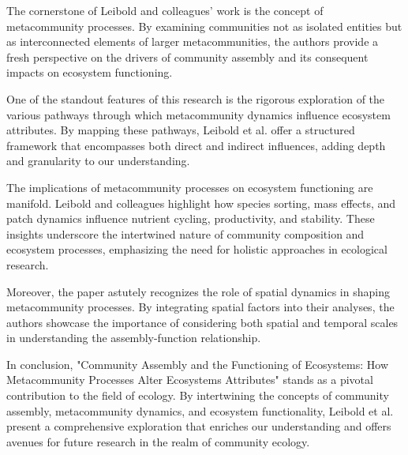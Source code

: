 \documentclass[sn-nature]{sn-jnl}%
\theoremstyle{thmstyleone}%
\theoremstyle{thmstyletwo}%
\theoremstyle{thmstylethree}%
\begin{document}
The cornerstone of Leibold and colleagues' work is the concept of metacommunity processes. By examining communities not as isolated entities but as interconnected elements of larger metacommunities, the authors provide a fresh perspective on the drivers of community assembly and its consequent impacts on ecosystem functioning.

One of the standout features of this research is the rigorous exploration of the various pathways through which metacommunity dynamics influence ecosystem attributes. By mapping these pathways, Leibold et al. offer a structured framework that encompasses both direct and indirect influences, adding depth and granularity to our understanding.

The implications of metacommunity processes on ecosystem functioning are manifold. Leibold and colleagues highlight how species sorting, mass effects, and patch dynamics influence nutrient cycling, productivity, and stability. These insights underscore the intertwined nature of community composition and ecosystem processes, emphasizing the need for holistic approaches in ecological research.

Moreover, the paper astutely recognizes the role of spatial dynamics in shaping metacommunity processes. By integrating spatial factors into their analyses, the authors showcase the importance of considering both spatial and temporal scales in understanding the assembly-function relationship.

In conclusion, "Community Assembly and the Functioning of Ecosystems: How Metacommunity Processes Alter Ecosystems Attributes" stands as a pivotal contribution to the field of ecology. By intertwining the concepts of community assembly, metacommunity dynamics, and ecosystem functionality, Leibold et al. present a comprehensive exploration that enriches our understanding and offers avenues for future research in the realm of community ecology.
\end{document}
